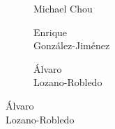\begin{frame}[plain]
\begin{figure}[h]
\begin{subfigure}{0.20\textwidth}
	\caption{\tiny Michael Chou}
	\end{subfigure} \quad
	\begin{subfigure}{0.20\textwidth}
	\captionsetup{labelformat=empty}
	\centering
	\caption{\tiny \hspace{0.7cm}Enrique \\ \;\;\;Gonz\'alez-Jim\'enez}
	\end{subfigure}
	\begin{subfigure}{0.20\textwidth}
	\captionsetup{labelformat=empty}
	\centering
	\caption{\tiny \hspace{0.7cm}\'Alvaro \\ \;\;\;\;\;Lozano-Robledo}

\end{subfigure}
\end{figure}
\end{frame}
